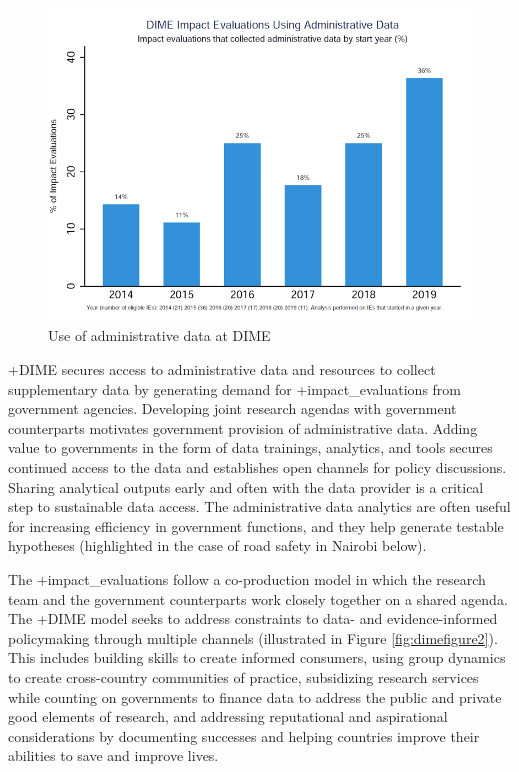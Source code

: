 \documentclass[
]{WileySix}
\begin{document}
\begin{figure}
\includegraphics[width=1\linewidth]{./assets/dime/dimefigure1web} \caption{Use of administrative data at DIME}\label{fig:dimefigure1}
\end{figure}

+DIME\textbar{} secures access to administrative data and resources to collect supplementary data by generating demand for +impact\_evaluations\textbar{} from government agencies. Developing joint research agendas with government counterparts motivates government provision of administrative data. Adding value to governments in the form of data trainings, analytics, and tools secures continued access to the data and establishes open channels for policy discussions. Sharing analytical outputs early and often with the data provider is a critical step to sustainable data access. The administrative data analytics are often useful for increasing efficiency in government functions, and they help generate testable hypotheses (highlighted in the case of road safety in Nairobi below).

The +impact\_evaluations\textbar{} follow a co-production model in which the research team and the government counterparts work closely together on a shared agenda. The +DIME\textbar{} model seeks to address constraints to data- and evidence-informed policymaking through multiple channels (illustrated in Figure \ref{fig:dimefigure2}). This includes building skills to create informed consumers, using group dynamics to create cross-country communities of practice, subsidizing research services while counting on governments to finance data to address the public and private good elements of research, and addressing reputational and aspirational considerations by documenting successes and helping countries improve their abilities to save and improve lives.
\end{document}

